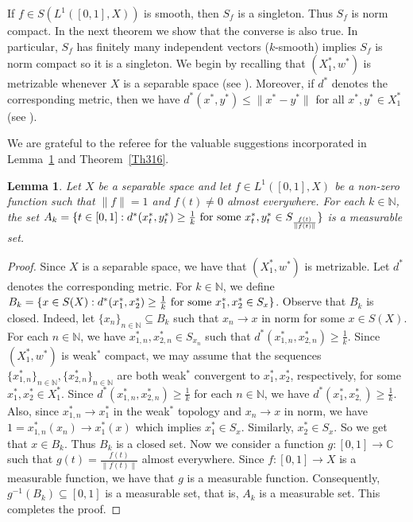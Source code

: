 \documentclass[12pt]{amsart}
\newtheorem{lemma}[theorem]{Lemma}
\theoremstyle{definition}
\numberwithin{equation}{section}
\begin{document}
    If $f\in S(L^1([0,1],X))$ is smooth, then $S_{f}$ is a singleton. Thus $S_{f}$ is norm compact. In the next theorem we show that the converse is also true. In particular, $S_{f}$ has finitely many independent vectors ($k$-smooth) implies $S_{f}$ is norm compact so it is a singleton. We begin by recalling that $(X_{1}^*, w^*)$ is metrizable whenever $X$ is a separable space (see \cite[Theorem~3.16]{RW}). Moreover, if $d^*$ denotes the corresponding metric, then we have $d^*(x^*, y^*)\leq \|x^*-y^*\|$ for all $x^*, y^*\in X_{1}^*$ (see \cite[Pg.~69]{RW}).
    
 We are grateful to the referee for the valuable suggestions incorporated in Lemma~\ref{L1} and Theorem~\ref{Th316}.
    
    \begin{lemma}\label{L1}
        Let $X$ be a separable space and let $f\in L^{1}([0,1],X)$ be a non-zero function such that $\|f\|=1$ and $f(t)\neq0$ almost everywhere. For each $k\in \mathbb{N}$, the set $A_{k}=\{t\in [0,1]:d^*(x_{t}^*, y_{t}^*)\geq \frac{1}{k}\textnormal{ for some }x_{t}^*, y_{t}^*\in S_{\frac{f(t)}{\|f(t)\|}}\}$ is a measurable set.
    \end{lemma}
    \begin{proof}
        Since $X$ is a separable space, we have that $(X_{1}^*, w^*)$ is metrizable. Let $d^*$ denotes the corresponding metric. For $k\in \mathbb{N}$, we define $B_{k}=\{x\in S(X):d^*(x_{1}^*, x_{2}^*)\geq \frac{1}{k}\textnormal{ for some }x_{1}^*, x_{2}^*\in S_{x}\}$. Observe that $B_{k}$ is closed. Indeed, let $\{x_{n}\}_{n\in \mathbb{N}}\subseteq B_{k}$ such that $x_{n}\to x$ in norm for some $x\in S(X)$. For each $n\in \mathbb{N}$, we have $x_{1, n}^*, x_{2, n}^*\in S_{x_{n}}$ such that $d^*(x_{1, n}^*, x_{2, n}^*)\geq \frac{1}{k}$. Since $(X_{1}^*, w^*)$ is weak$^*$ compact, we may assume that the sequences $\{x_{1, n}^*\}_{n\in \mathbb{N}}, \{x_{2, n}^*\}_{n\in \mathbb{N}}$ are both weak$^*$ convergent to $x_{1}^*, x_{2}^*$, respectively, for some $x_{1}^*, x_{2}^*\in X_{1}^*$. Since $d^*(x_{1, n}^*, x_{2, n}^*)\geq \frac{1}{k}$ for each $n\in \mathbb{N}$, we have $d^*(x_{1}^*, x_{2, }^*)\geq \frac{1}{k}$. Also, since $x_{1, n}^*\to x_{1}^*$ in the weak$^*$ topology and $x_{n}\to x$ in norm, we have $1=x_{1, n}^*(x_{n})\to x_{1}^*(x)$ which implies $x_{1}^*\in S_{x}$. Similarly, $x_{2}^*\in S_{x}$. So we get that $x\in B_{k}$. Thus $B_{k}$ is a closed set. Now we consider a function $g:[0,1]\to \mathbb{C}$ such that $g(t)=\frac{f(t)}{\|f(t)\|}$ almost everywhere. Since $f:[0,1]\to X$ is a measurable function, we have that $g$ is a measurable function. Consequently, $g^{-1}(B_{k})\subseteq [0,1]$ is a measurable set, that is, $A_{k}$ is a measurable set. This completes the proof.
    \end{proof}
\end{document}
